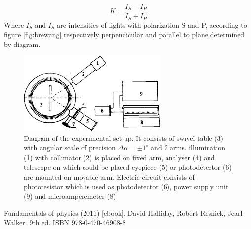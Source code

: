 \documentclass[a4paper,12pt]{article}
\begin{document}
\begin{equation}
    K = \frac{I_S-I_P}{I_S+I_P} \label{eq:K}
\end{equation}
Where $I_S$ and $I_S$ are intensities of lights with polarization S and P, according to figure \ref{fig:brewang} respectively perpendicular and parallel to plane determined by diagram.
\begin{figure}[ht]
\begin{center}
    \includegraphics[width=0.65\textwidth]{goniometer}
    \caption{Diagram of the experimental set-up. It consists of swivel table (3) with angular scale of precision $\Delta\alpha = \pm 1^\circ$ and 2 arms. illumination (1) with collimator (2) is placed on fixed arm, analyser (4) and telescope on which could be placed eyepiece (5) or photodetector (6) are mounted on movable arm. Electric circuit consists of photoresistor which is used as photodetector (6), power supply unit (9) and microamperemeter (8)}
    \label{fig:goniometer}
\end{center}
\end{figure}



\begin{thebibliography}{2}
    Fundamentals of physics (2011) [ebook]. David Halliday, Robert Resnick, Jearl Walker. 9th ed. ISBN 978-0-470-46908-8
\end{thebibliography}
\end{document}
